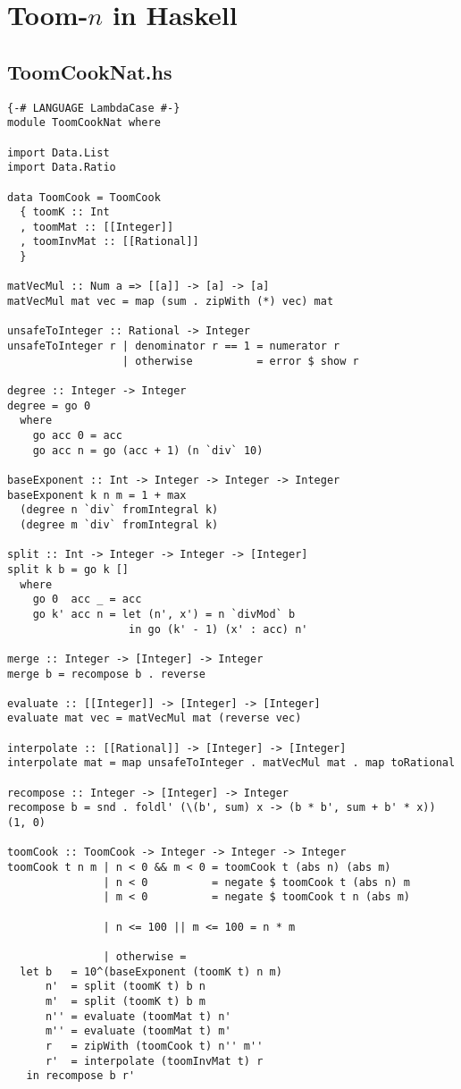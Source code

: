 \section{Toom-$n$ in Haskell}
\subsection{ToomCookNat.hs}
\begin{verbatim}
{-# LANGUAGE LambdaCase #-}
module ToomCookNat where

import Data.List
import Data.Ratio

data ToomCook = ToomCook
  { toomK :: Int
  , toomMat :: [[Integer]]
  , toomInvMat :: [[Rational]]
  }

matVecMul :: Num a => [[a]] -> [a] -> [a]
matVecMul mat vec = map (sum . zipWith (*) vec) mat

unsafeToInteger :: Rational -> Integer
unsafeToInteger r | denominator r == 1 = numerator r
                  | otherwise          = error $ show r

degree :: Integer -> Integer
degree = go 0
  where
    go acc 0 = acc
    go acc n = go (acc + 1) (n `div` 10)

baseExponent :: Int -> Integer -> Integer -> Integer
baseExponent k n m = 1 + max
  (degree n `div` fromIntegral k)
  (degree m `div` fromIntegral k)

split :: Int -> Integer -> Integer -> [Integer]
split k b = go k []
  where
    go 0  acc _ = acc
    go k' acc n = let (n', x') = n `divMod` b
                   in go (k' - 1) (x' : acc) n'

merge :: Integer -> [Integer] -> Integer
merge b = recompose b . reverse

evaluate :: [[Integer]] -> [Integer] -> [Integer]
evaluate mat vec = matVecMul mat (reverse vec)

interpolate :: [[Rational]] -> [Integer] -> [Integer]
interpolate mat = map unsafeToInteger . matVecMul mat . map toRational

recompose :: Integer -> [Integer] -> Integer
recompose b = snd . foldl' (\(b', sum) x -> (b * b', sum + b' * x)) (1, 0)

toomCook :: ToomCook -> Integer -> Integer -> Integer
toomCook t n m | n < 0 && m < 0 = toomCook t (abs n) (abs m)
               | n < 0          = negate $ toomCook t (abs n) m
               | m < 0          = negate $ toomCook t n (abs m)

               | n <= 100 || m <= 100 = n * m

               | otherwise =
  let b   = 10^(baseExponent (toomK t) n m)
      n'  = split (toomK t) b n
      m'  = split (toomK t) b m
      n'' = evaluate (toomMat t) n'
      m'' = evaluate (toomMat t) m'
      r   = zipWith (toomCook t) n'' m''
      r'  = interpolate (toomInvMat t) r
   in recompose b r'
\end{verbatim}

